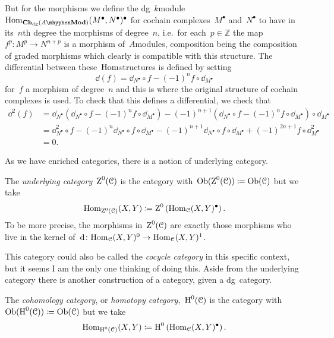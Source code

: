 \begin{refsection}
\begin{example}
  But for the morphisms we define the dg~$k$\dash module~$\Hom_{\Ch_\dg(A\mhyphen\Mod)}(M^\bullet,N^\bullet)^\bullet$ for cochain complexes~$M^\bullet$ and~$N^\bullet$ to have in its~$n$th degree the morphisms of degree~$n$, i.e.~for each~$p\in\mathbb{Z}$ the map~$f^p\colon M^p\to N^{n+p}$ is a morphism of~$A$\dash modules, composition being the composition of graded morphisms which clearly is compatible with this structure. The differential between these~$\mathrm{Hom}$\dash structures is defined by setting
  \begin{equation}
    \dd(f)=\dd_{N^\bullet}\circ f-(-1)^nf\circ\dd_{M^\bullet}
  \end{equation}
  for~$f$ a morphism of degree~$n$ and this is where the original structure of cochain complexes is used. To check that this defines a differential, we check that
  \begin{equation}
    \begin{aligned}
      \dd^2(f)&=\dd_{N^\bullet}\left( \dd_{N^\bullet}\circ f-(-1)^nf\circ\dd_{M^\bullet} \right)-(-1)^{n+1}\left( \dd_{N^\bullet}\circ f-(-1)^nf\circ\dd_{M^\bullet} \right)\circ\dd_{M^\bullet} \\
      &=\dd_{N^\bullet}^2\circ f-(-1)^n\dd_{N^\bullet}\circ f\circ\dd_{M^\bullet}-(-1)^{n+1}\dd_{N^\bullet}\circ f\circ\dd_{M^\bullet}+(-1)^{2n+1}f\circ\dd_{M^\bullet}^2 \\
      &=0.
    \end{aligned}
  \end{equation}
\end{example}

As we have enriched categories, there is a notion of underlying category.
\begin{definition}
  \label{definition:underlying-category}
  The \emph{underlying category}~$\operatorname{Z}^0(\mathcal{C})$ is the category with~$\operatorname{Ob}(\operatorname{Z}^0(\mathcal{C}))\coloneqq\operatorname{Ob}(\mathcal{C})$ but we take
  \begin{equation}
    \mathrm{Hom}_{\operatorname{Z}^0(\mathcal{C})}(X,Y)\coloneqq\operatorname{Z}^0\left( \mathrm{Hom}_{\mathcal{C}}(X,Y)^\bullet \right).
  \end{equation}
  To be more precise, the morphisms in~$\operatorname{Z}^0(\mathcal{C})$ are exactly those morphisms who live in the kernel of~$\mathrm{d}\colon\mathrm{Hom}_{\mathcal{C}}(X,Y)^0\to\mathrm{Hom}_{\mathcal{C}}(X,Y)^1$.
\end{definition}
This category could also be called the \emph{cocycle category} in this specific context, but it seems I am the only one thinking of doing this. Aside from the underlying category there is another construction of a category, given a dg~category.
\begin{definition}
  \label{definition:homotopy-category}
  The \emph{cohomology category}, or \emph{homotopy category},~$\operatorname{H}^0(\mathcal{C})$ is the category with~$\operatorname{Ob}(\operatorname{H}^0(\mathcal{C}))\coloneqq\operatorname{Ob}(\mathcal{C})$ but we take
  \begin{equation}
    \mathrm{Hom}_{\operatorname{H}^0(\mathcal{C})}(X,Y)\coloneqq\operatorname{H}^0\left( \mathrm{Hom}_{\mathcal{C}}(X,Y)^\bullet \right).
  \end{equation}
\end{definition}


\end{refsection}
